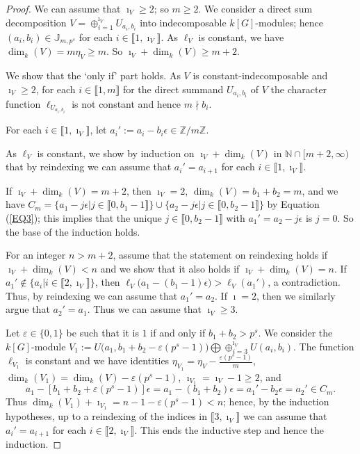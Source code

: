 \documentclass[11pt]{amsart}
\begin{document}
\begin{proof}
We can assume that $\imath_V\ge 2$; so $m\ge 2$. We consider a direct sum decomposition $V=\oplus_{i=1}^{\imath_V} U_{a_i,b_i}$ into indecomposable $k[G]$-modules; hence $(a_i,b_i)\in\mathbb J_{m,p^s}$ for each $i\in\llbracket1,\imath_V\rrbracket$. As $\ell_V$ is constant, we have $\dim_k(V)=m\eta_V\ge m$. So $\imath_V+\dim_k(V)\ge m+2$.

We show that the `only if' part holds. As $V$ is constant-indecomposable and $\imath_V\ge 2$, for each $i\in\llbracket1,m\rrbracket$ for the direct summand $U_{a_i,b_i}$ of $V$ the character function $\ell_{U_{a_i,b_i}}$ is not constant and hence $m\nmid b_i$. 

For each $i\in\llbracket1,\imath_V\rrbracket$, let $a_i':=a_i-b_i\epsilon\in\mathbb Z/m\mathbb Z$. 

As $\ell_V$ is constant, we show by induction on $\imath_V+\dim_k(V)$ in $\mathbb N\cap [m+2,\infty)$ that by reindexing we can assume that $a_i'=a_{i+1}$ for each $i\in\llbracket1,\imath_V\rrbracket$. 

If $\imath_V+\dim_k(V)=m+2$, then $\imath_V=2$, $\dim_k(V)=b_1+b_2=m$, and we have $C_m=\{a_1-j\epsilon|j\in\llbracket0,b_1-1\rrbracket\}\cup \{a_2-j\epsilon|j\in\llbracket0,b_2-1\rrbracket\}$ by Equation (\ref{EQ3}); this implies that the unique $j\in\llbracket0,b_2-1\rrbracket$ with $a_1'=a_2-j\epsilon$ is $j=0$. So the base of the induction holds. 

For an integer $n>m+2$, assume that the statement on reindexing holds if $\imath_V+\dim_k(V)<n$ and we show that it also holds if $\imath_V+\dim_k(V)=n$. If $a_1'\notin\{a_i|i\in\llbracket2,\imath_V\rrbracket\}$, then $\ell_V\bigl(a_1-(b_1-1)\epsilon\bigr)>\ell_V(a_1')$, a contradiction. Thus, by reindexing we can assume that  $a_1'=a_2$. If $\imath=2$, then we similarly argue that $a_2'=a_1$. Thus we can assume that $\imath_V\ge 3$. 

Let $\varepsilon\in\{0,1\}$ be such that it is $1$ if and only if $b_1+b_2> p^s$. We consider the $k[G]$-module $V_1:=U\bigl(a_1,b_1+b_2-\varepsilon(p^s-1)\bigr)\bigoplus\oplus_{i=3}^{\imath_V} U(a_i,b_i)$. The function $\ell_{V_1}$ is constant and we have identities $\eta_{V_1}=\eta_{V}-\frac{\varepsilon(p^s-1)}{m}$, $\dim_k(V_1)=\dim_k(V)-\varepsilon(p^s-1)$, $\imath_{V_1}=\imath_V-1\ge 2$, and 
$$a_1-[b_1+b_2+\varepsilon(p^s-1)]\epsilon=a_1-(b_1+b_2)\epsilon=a_1'-b_2\epsilon=a_2'\in C_m.$$ 
Thus $\dim_k(V_1)+\imath_{V_1}=n-1-\varepsilon(p^s-1)<n$; hence, by the induction hypotheses, up to a reindexing of the indices in $\llbracket3,\imath_V\rrbracket$ we can assume that $a_i'=a_{i+1}$ for each $i\in\llbracket2,\imath_V\rrbracket$. This ends the inductive step and hence the induction.


\end{proof}
\end{document}
